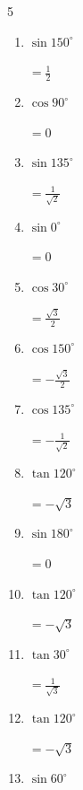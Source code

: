 \begin{multicols}{5}
\begin{enumerate}
        $\displaystyle =-1$

  \item $\displaystyle \sin{150^\circ}$

        $\displaystyle =\frac{1}{2}$

  \item $\displaystyle \cos{90^\circ}$

        $\displaystyle =0$

  \item $\displaystyle \sin{135^\circ}$

        $\displaystyle =\frac{1}{\sqrt{2}}$

  \item $\displaystyle \sin{0^\circ}$

        $\displaystyle =0$

  \item $\displaystyle \cos{30^\circ}$

        $\displaystyle =\frac{\sqrt{3}}{2}$

  \item $\displaystyle \cos{150^\circ}$

        $\displaystyle =-\frac{\sqrt{3}}{2}$

  \item $\displaystyle \cos{135^\circ}$

        $\displaystyle =-\frac{1}{\sqrt{2}}$

\columnbreak %

  \item $\displaystyle \tan{120^\circ}$

        $\displaystyle =-\sqrt{3}$

  \item $\displaystyle \sin{180^\circ}$

        $\displaystyle =0$

  \item $\displaystyle \tan{120^\circ}$

        $\displaystyle =-\sqrt{3}$

  \item $\displaystyle \tan{30^\circ}$

        $\displaystyle =\frac{1}{\sqrt{3}}$

  \item $\displaystyle \tan{120^\circ}$

        $\displaystyle =-\sqrt{3}$

  \item $\displaystyle \sin{60^\circ}$


\end{enumerate}
\end{multicols}
